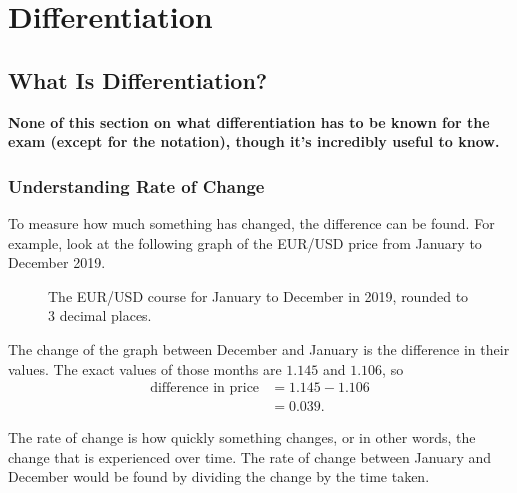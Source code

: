 \chapter{Differentiation}
\section{What Is Differentiation?}

\textbf{None of this section on what differentiation has to be known for the exam (except for the notation), though it's incredibly useful to know.}

\subsection{Understanding Rate of Change}
To measure how much something has changed, the difference can be found. For example, look at the following graph of the EUR/USD price from January to December 2019.

\begin{figure}[h!]
	\centering
	\caption{The EUR/USD course for January to December in 2019, rounded to 3 decimal places.}
	\label{fig:EURUSD}
\end{figure}

The change of the graph between December and January is the difference in their values. The exact values of those months are $1.145$ and $1.106$, so
\begin{align*}
	\text{difference in price} &= 1.145 - 1.106\\
	&=0.039\text{.}
\end{align*}

The rate of change is how quickly something changes, or in other words, the change that is experienced over time. The rate of change between January and December would be found by dividing the change by the time taken.

